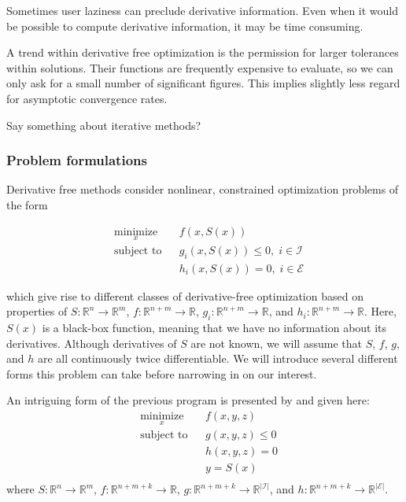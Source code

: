 \documentclass{article}
\begin{document}
Sometimes user laziness can preclude derivative information.
Even when it would be possible to compute derivative information, it may be time consuming.

A trend within derivative free optimization is the permission for larger tolerances within solutions.
Their functions are frequently expensive to evaluate, so we can only ask for a small number of significant figures.
This implies slightly less regard for asymptotic convergence rates.



Say something about iterative methods?

\subsubsection{Problem formulations}

Derivative free methods consider nonlinear, constrained optimization problems of the form

\begin{equation*}
\begin{aligned}
& \underset{x}{\text{minimize}} & & f(x, S(x)) \\
& \text{subject to} & & g_i(x, S(x)) \leq 0, \; i \in \mathcal{I} \\
& & & h_i(x, S(x)) = 0, \; i \in \mathcal{E}
\end{aligned}
\end{equation*}

which give rise to different classes of derivative-free optimization based on properties of
$S  : \mathbb{R}^n \to \mathbb{R}^m$,
$f  : \mathbb{R}^{n+m} \to \mathbb{R}$,
$g_i: \mathbb{R}^{n+m} \to \mathbb{R}$, and
$h_i: \mathbb{R}^{n+m} \to \mathbb{R}$.
Here, $S(x)$ is a black-box function, meaning that we have no information about its derivatives.
Although derivatives of $S$ are not known, 
we will assume that $S$, $f$, $g$, and $h$ are all continuously twice differentiable.
We will introduce several different forms this problem can take before narrowing in on our interest.


\underline{\hspace{8cm}}

An intriguing form of the previous program is presented by \cite{DUMMY:Biegler} and given here:
\begin{equation*}
\begin{aligned}
& \underset{x}{\text{minimize}} & & f(x, y, z) \\
& \text{subject to} & & g(x, y, z) \leq 0 \\
& & & h(x, y, z) = 0 \\
& & & y = S(x) \;  \\
\end{aligned}
\end{equation*}
where
$S : \mathbb{R}^n \to \mathbb{R}^m$,
$f : \mathbb{R}^{n+m+k} \to \mathbb{R}$,
$g : \mathbb{R}^{n+m+k} \to \mathbb{R}^{|\mathcal{I}|}$, and
$h : \mathbb{R}^{n+m+k} \to \mathbb{R}^{|\mathcal{E}|}$.
\end{document}
